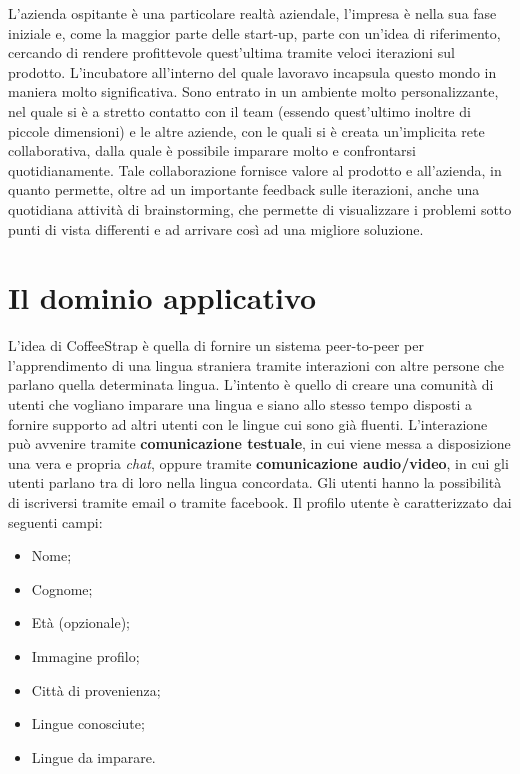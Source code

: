 L'azienda ospitante è una particolare realtà aziendale, l'impresa è nella sua fase iniziale e, come la maggior parte delle start-up, parte con un'idea di riferimento, cercando di rendere profittevole quest'ultima tramite veloci iterazioni sul prodotto. L'incubatore all'interno del quale lavoravo incapsula questo mondo in maniera molto significativa. Sono entrato in un ambiente molto personalizzante, nel quale si è a stretto contatto con il team (essendo quest'ultimo inoltre di piccole dimensioni) e le altre aziende, con le quali si è creata un'implicita rete collaborativa, dalla quale è possibile imparare molto e confrontarsi quotidianamente. Tale collaborazione fornisce valore al prodotto e all'azienda, in quanto permette, oltre ad un importante feedback sulle iterazioni, anche una quotidiana attività di \gls{brainstorming}, che permette di visualizzare i problemi sotto punti di vista differenti e ad arrivare così ad una migliore soluzione.

\section{Il dominio applicativo}

L'idea di CoffeeStrap è quella di fornire un sistema \gls{peer-to-peer} per l'apprendimento di una lingua straniera tramite interazioni con altre persone che parlano quella determinata lingua. L'intento è quello di creare una comunità di utenti che vogliano imparare una lingua e siano allo stesso tempo disposti a fornire supporto ad altri utenti con le lingue cui sono già fluenti. L'interazione può avvenire tramite \textbf{comunicazione testuale}, in cui viene messa a disposizione una vera e propria \textit{chat}, oppure tramite \textbf{comunicazione audio/video}, in cui gli utenti parlano tra di loro nella lingua concordata. Gli utenti hanno la possibilità di iscriversi tramite email o tramite facebook. Il profilo utente è caratterizzato dai seguenti campi:

\begin{itemize}

\item Nome;
\item Cognome;
\item Età (opzionale);
\item Immagine profilo;
\item Città di provenienza;
\item Lingue conosciute;
\item Lingue da imparare.

\end{itemize}

